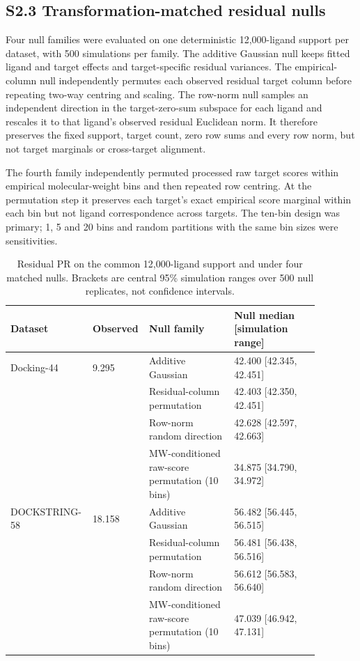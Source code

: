 \documentclass[11pt]{article}
\begin{document}
\subsection*{S2.3 Transformation-matched residual nulls}

Four null families were evaluated on one deterministic 12,000-ligand support
per dataset, with 500 simulations per family. The additive Gaussian null keeps
fitted ligand and target effects and target-specific residual variances. The
empirical-column null independently permutes each observed residual target
column before repeating two-way centring and scaling. The row-norm null samples
an independent direction in the target-zero-sum subspace for each ligand and
rescales it to that ligand's observed residual Euclidean norm. It therefore
preserves the fixed support, target count, zero row sums and every row norm, but
not target marginals or cross-target alignment.

The fourth family independently permuted processed raw target scores within
empirical molecular-weight bins and then repeated row centring. At the
permutation step it preserves each target's exact empirical score marginal
within each bin but not ligand correspondence across targets. The ten-bin
design was primary; 1, 5 and 20 bins and random partitions with the same bin
sizes were sensitivities.

\begin{table}[htbp]
\centering
\caption{Residual PR on the common 12,000-ligand support and under four
matched nulls. Brackets are central 95\% simulation ranges over 500 null
replicates, not confidence intervals.}
\label{tab:s2nulls}
\small
\begin{tabular}{p{0.20\linewidth}p{0.14\linewidth}p{0.27\linewidth}p{0.27\linewidth}}
\toprule
Dataset & Observed & Null family & Null median [simulation range] \\
\midrule
Docking-44 & 9.295 & Additive Gaussian & 42.400 [42.345, 42.451] \\
 & & Residual-column permutation & 42.403 [42.350, 42.451] \\
 & & Row-norm random direction & 42.628 [42.597, 42.663] \\
 & & MW-conditioned raw-score permutation (10 bins) & 34.875 [34.790, 34.972] \\
\addlinespace
DOCKSTRING-58 & 18.158 & Additive Gaussian & 56.482 [56.445, 56.515] \\
 & & Residual-column permutation & 56.481 [56.438, 56.516] \\
 & & Row-norm random direction & 56.612 [56.583, 56.640] \\
 & & MW-conditioned raw-score permutation (10 bins) & 47.039 [46.942, 47.131] \\
\bottomrule
\end{tabular}
\end{table}
\end{document}
